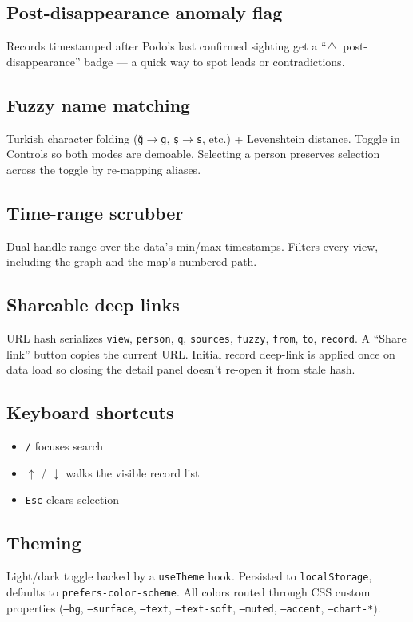 \documentclass[11pt,a4paper]{article}
\newcommand{\code}[1]{\texttt{\small #1}}
\begin{document}
\subsection{Post-disappearance anomaly flag}
Records timestamped after Podo's last confirmed sighting get a ``$\triangle$~post-disappearance'' badge --- a quick way to spot leads or contradictions.

\subsection{Fuzzy name matching}
Turkish character folding (\code{ğ}$\rightarrow$\code{g}, \code{ş}$\rightarrow$\code{s}, etc.) + Levenshtein distance. Toggle in Controls so both modes are demoable. Selecting a person preserves selection across the toggle by re-mapping aliases.

\subsection{Time-range scrubber}
Dual-handle range over the data's min/max timestamps. Filters every view, including the graph and the map's numbered path.

\subsection{Shareable deep links}
URL hash serializes \code{view}, \code{person}, \code{q}, \code{sources}, \code{fuzzy}, \code{from}, \code{to}, \code{record}. A ``Share link'' button copies the current URL. Initial record deep-link is applied once on data load so closing the detail panel doesn't re-open it from stale hash.

\subsection{Keyboard shortcuts}
\begin{itemize}
  \item \code{/} focuses search
  \item \code{$\uparrow$} / \code{$\downarrow$} walks the visible record list
  \item \code{Esc} clears selection
\end{itemize}

\subsection{Theming}
Light/dark toggle backed by a \code{useTheme} hook. Persisted to \code{localStorage}, defaults to \code{prefers-color-scheme}. All colors routed through CSS custom properties (\code{--bg}, \code{--surface}, \code{--text}, \code{--text-soft}, \code{--muted}, \code{--accent}, \code{--chart-*}).
\end{document}
